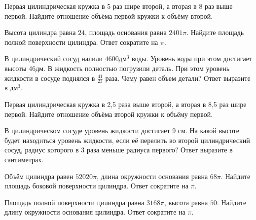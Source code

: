 \documentclass[4apaper]{article}
\begin{document}
\begin{taskBN}{29}
 Первая цилиндрическая кружка в 5 раз шире второй, а вторая в 8 раз выше первой. Найдите отношение объёма первой кружки к объёму второй.
\end{taskBN}

\begin{taskBN}{30}
Высота цилиндра равна $24$, площадь основания равна $2401\pi$. Найдите площадь полной поверхности цилиндра. Ответ сократите на $\pi$.
\end{taskBN}

\begin{taskBN}{31}
В цилиндрический сосуд налили $4600\mbox{дм}^3$ воды. Уровень воды при этом достигает высоты $46$дм. В жидкость полностью погрузили деталь. При этом уровень жидкости в сосуде поднялся в $\frac{41}{23}$ раза. Чему равен объем детали? Ответ выразите в $\mbox{дм}^3$.
\end{taskBN}

\begin{taskBN}{32}
 Первая цилиндрическая кружка в 2,5 раза выше второй, а вторая в 8,5 раз шире первой. Найдите отношение объёма второй кружки к объёму первой.
\end{taskBN}

\begin{taskBN}{33}
В цилиндрическом сосуде уровень жидкости достигает 9 см. На какой высоте будет находиться уровень жидкости, если её перелить во второй цилиндрический сосуд, радиус которого в 3 раза меньше радиуса первого? Ответ выразите в сантиметрах.
\end{taskBN}

\begin{taskBN}{34}
Объём цилиндра равен $52020\pi$, длина окружности основания равна $68\pi$. Найдите площадь боковой поверхности цилиндра. Ответ сократите на $\pi$.
\end{taskBN}

\begin{taskBN}{35}
Площадь полной поверхности цилиндра равна $3168\pi$, высота равна $50$. Найдите длину окружности основания цилиндра. Ответ сократите на $\pi$.
\end{taskBN}
\end{document}
